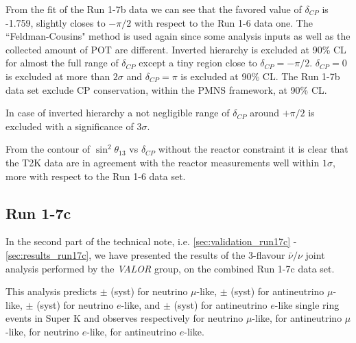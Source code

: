 From the fit of the Run 1-7b data we can see that the favored value of $\delta_{CP}$ is -1.759, slightly closes to $-\pi/2$
with respect to the Run 1-6 data one.
The ``Feldman-Cousins" method is used again since some analysis inputs as well as the collected amount of POT are different. 
Inverted hierarchy is excluded at 90\% CL for almost the full range of $\delta_{CP}$ except a tiny region close to $\delta_{CP} = -\pi/2$.
$\delta_{CP}=0$ is excluded at more than $2\sigma$ and $\delta_{CP}=\pi$ is excluded at 90\% CL.
The Run 1-7b data set exclude CP conservation, within the PMNS framework, at 90\% CL. 

In case of inverted hierarchy a not negligible range of $\delta_{CP}$ around $+\pi/2$ is excluded with 
a significance of $3\sigma$.

From the contour of $\sin^2 \theta_{13}$ vs $\delta_{CP}$ without the reactor constraint 
it is clear that the T2K data are in agreement with the reactor measurements well within $1\sigma$,
more with respect to the Run 1-6 data set.






\subsection{Run 1-7c}
\label{sec:summary_run17c}

In the second part of the technical note,
i.e. \cref{sec:validation_run17c} - \ref{sec:results_run17c},
we have presented the results of the 3-flavour $\bar{\nu}/\nu$ joint analysis
performed by the {\em VALOR} group,
on the combined Run 1-7c data set.

This analysis predicts 
\NskOscExpectationNumuRunOneSevenC{} $\pm$ \NskOscExpectationNumuErrorRunOneSevenC{} (syst) for neutrino $\mu$-like,
\NskOscExpectationNumuBarRunOneSevenC{} $\pm$ \NskOscExpectationNumuBarErrorRunOneSevenC{} (syst) for antineutrino $\mu$-like,
\NskOscExpectationNueRunOneSevenC{} $\pm$ \NskOscExpectationNueErrorRunOneSevenC{} (syst) for neutrino $e$-like,
and
\NskOscExpectationNueBarRunOneSevenC{} $\pm$ \NskOscExpectationNueBarErrorRunOneSevenC{} (syst) for antineutrino $e$-like
single ring events in Super K
and observes respectively 
\NskObservedNumuRunOneSevenC{} for neutrino $\mu$-like,
\NskObservedNumuBarRunOneSevenC{}  for antineutrino $\mu$-like,
\NskObservedNueRunOneSevenC{}  for neutrino $e$-like,
\NskObservedNueBarRunOneSevenC{}  for antineutrino $e$-like.

